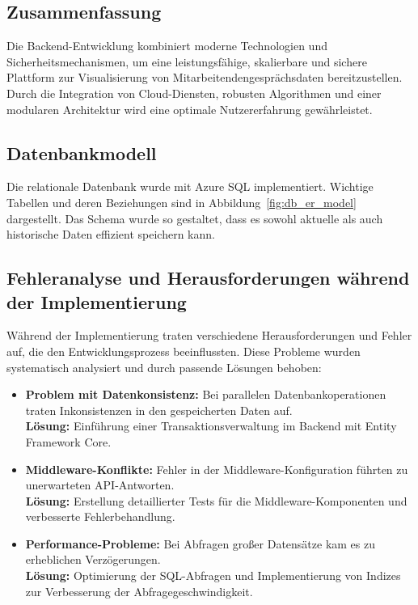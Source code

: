 \subsection{Zusammenfassung}
Die Backend-Entwicklung kombiniert moderne Technologien und Sicherheitsmechanismen, um eine leistungsfähige, skalierbare und sichere Plattform zur Visualisierung von Mitarbeitendengesprächsdaten bereitzustellen. Durch die Integration von Cloud-Diensten, robusten Algorithmen und einer modularen Architektur wird eine optimale Nutzererfahrung gewährleistet.


\subsection{Datenbankmodell}
Die relationale Datenbank wurde mit Azure SQL implementiert. Wichtige Tabellen und deren Beziehungen sind in Abbildung~\ref{fig:db_er_model} dargestellt. Das Schema wurde so gestaltet, dass es sowohl aktuelle als auch historische Daten effizient speichern kann.



\subsection{Fehleranalyse und Herausforderungen während der Implementierung}
Während der Implementierung traten verschiedene Herausforderungen und Fehler auf, die den Entwicklungsprozess beeinflussten. Diese Probleme wurden systematisch analysiert und durch passende Lösungen behoben:
\begin{itemize}
    \item \textbf{Problem mit Datenkonsistenz:} Bei parallelen Datenbankoperationen traten Inkonsistenzen in den gespeicherten Daten auf. \\
    \textbf{Lösung:} Einführung einer Transaktionsverwaltung im Backend mit Entity Framework Core.
    
    \item \textbf{Middleware-Konflikte:} Fehler in der Middleware-Konfiguration führten zu unerwarteten API-Antworten. \\
    \textbf{Lösung:} Erstellung detaillierter Tests für die Middleware-Komponenten und verbesserte Fehlerbehandlung.

    \item \textbf{Performance-Probleme:} Bei Abfragen großer Datensätze kam es zu erheblichen Verzögerungen. \\
    \textbf{Lösung:} Optimierung der SQL-Abfragen und Implementierung von Indizes zur Verbesserung der Abfragegeschwindigkeit.
\end{itemize}

